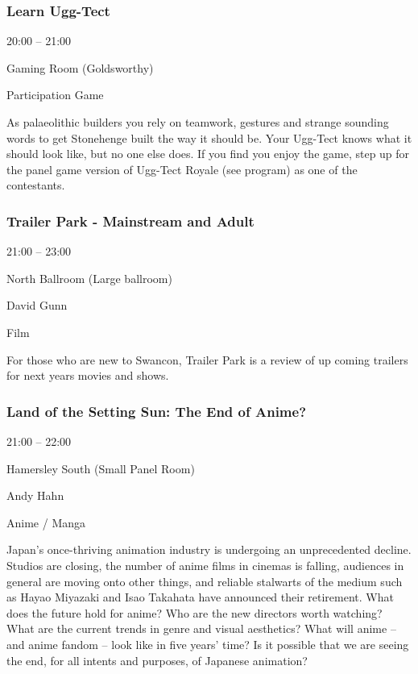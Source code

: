 \documentclass{scrreprt}
\begin{document}
\begin{multicols}{2}
\subsubsection*{Learn Ugg-Tect}\begin{description}
\setlength{\itemsep}{0pt}
\setlength{\parsep}{0pt}
\setlength{\parskip}{0pt}
\item[Time:]{20:00 -- 21:00}
\item[Venue:]{Gaming Room (Goldsworthy)}
\item[Tags:]{Participation Game}\end{description}
As palaeolithic builders you rely on teamwork, gestures and strange sounding words to get Stonehenge built the way it should be. Your Ugg-Tect knows what it should look like, but no one else does.  If you find you enjoy the game, step up for the panel game version of Ugg-Tect Royale (see program) as one of the contestants.
\subsubsection*{Trailer Park - Mainstream and Adult}\begin{description}
\setlength{\itemsep}{0pt}
\setlength{\parsep}{0pt}
\setlength{\parskip}{0pt}
\item[Time:]{21:00 -- 23:00}
\item[Venue:]{North Ballroom (Large ballroom)}
\item[People:]{David Gunn}
\item[Tags:]{Film}\end{description}
For those who are new to Swancon, Trailer Park is a review of up coming trailers for next years movies and shows.
\subsubsection*{Land of the Setting Sun: The End of Anime?}\begin{description}
\setlength{\itemsep}{0pt}
\setlength{\parsep}{0pt}
\setlength{\parskip}{0pt}
\item[Time:]{21:00 -- 22:00}
\item[Venue:]{Hamersley South (Small Panel Room)}
\item[People:]{Andy Hahn}
\item[Tags:]{Anime / Manga}\end{description}
Japan’s once-thriving animation industry is undergoing an unprecedented decline. Studios are closing, the number of anime films in cinemas is falling, audiences in general are moving onto other things, and reliable stalwarts of the medium such as Hayao Miyazaki and Isao Takahata have announced their retirement. What does the future hold for anime? Who are the new directors worth watching? What are the current trends in genre and visual aesthetics? What will anime – and anime fandom – look like in five years’ time? Is it possible that we are seeing the end, for all intents and purposes, of Japanese animation?

\end{multicols}
\end{document}
